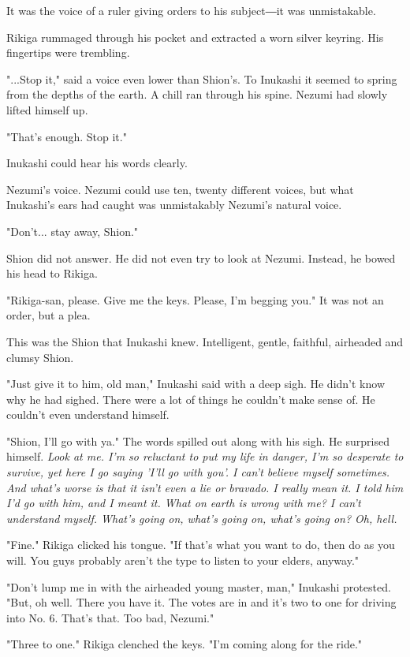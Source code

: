 It was the voice of a ruler giving orders to his subject―it was
unmistakable.

Rikiga rummaged through his pocket and extracted a worn silver keyring.
His fingertips were trembling.

"...Stop it," said a voice even lower than Shion's. To Inukashi it
seemed to spring from the depths of the earth. A chill ran through his
spine. Nezumi had slowly lifted himself up.

"That's enough. Stop it."

Inukashi could hear his words clearly.

Nezumi's voice. Nezumi could use ten, twenty different voices, but what
Inukashi's ears had caught was unmistakably Nezumi's natural voice.

"Don't... stay away, Shion."

Shion did not answer. He did not even try to look at Nezumi. Instead, he
bowed his head to Rikiga.

"Rikiga-san, please. Give me the keys. Please, I'm begging you." It was
not an order, but a plea.

This was the Shion that Inukashi knew. Intelligent, gentle, faithful,
airheaded and clumsy Shion.~

"Just give it to him, old man," Inukashi said with a deep sigh. He
didn't know why he had sighed. There were a lot of things he couldn't
make sense of. He couldn't even understand himself.

"Shion, I'll go with ya." The words spilled out along with his sigh. He
surprised himself. \emph{Look at me. I'm so reluctant to put my life in
danger, I'm so desperate to survive, yet here I go saying 'I'll go with
you'. I can't believe myself sometimes. And what's worse is that it
isn't even a lie or bravado. I really mean it. I told him I'd go with
him, and I meant it. What on earth is wrong with me? I can't understand
myself. What's going on, what's going on, what's going on? Oh, hell.}

"Fine." Rikiga clicked his tongue. "If that's what you want to do, then
do as you will. You guys probably aren't the type to listen to your
elders, anyway."

"Don't lump me in with the airheaded young master, man," Inukashi
protested. "But, oh well. There you have it. The votes are in and it's
two to one for driving into No. 6. That's that. Too bad, Nezumi."

"Three to one." Rikiga clenched the keys. "I'm coming along for the
ride."

